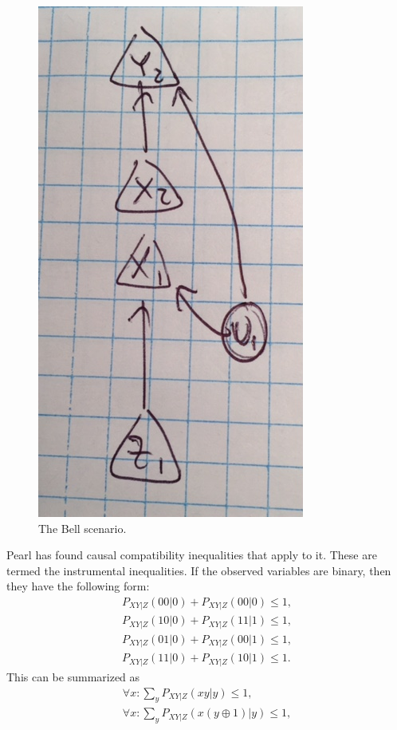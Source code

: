 \documentclass[aps,english,superscriptaddress,onecolumn,twoside,longbibliography,pra,floatfix,fleqn,notitlepage,nofootinbib]{revtex4-1}
\theoremstyle{definition}
\begin{document}
\begin{figure}[htb]
\begin{minipage}[htb]{0.5\linewidth}
\includegraphics[scale=0.3]{InterruptedInstrumental.jpg}
\caption{The Bell scenario.}\label{fig:InterruptedInstrumental}
\end{minipage}
\end{figure}

Pearl has found causal compatibility inequalities that apply to it.  These are termed the instrumental inequalities.  If the observed variables are binary, then they have the following form:
\begin{align}
P_{XY|Z}(00|0) +  P_{XY|Z}(00|0) \le 1,\nonumber\\
P_{XY|Z}(10|0) +  P_{XY|Z}(11|1) \le 1,\nonumber\\
P_{XY|Z}(01|0) +  P_{XY|Z}(00|1) \le 1,\nonumber\\
P_{XY|Z}(11|0) +  P_{XY|Z}(10|1) \le 1. \label{IIlongform}
\end{align}
This can be summarized as 
\begin{align}
\forall x: \sum_y P_{XY|Z}(xy|y) \le 1,\label{IIbinary1}\\
\forall x: \sum_y P_{XY|Z}(x (y\oplus 1)|y) \le 1,\label{IIbinary2}
\end{align}
\end{document}
